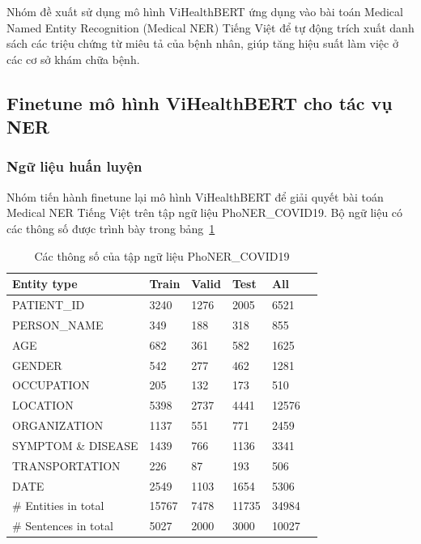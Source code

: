 \documentclass[12pt]{article}
\begin{document}
Nhóm đề xuất sử dụng mô hình ViHealthBERT ứng dụng vào bài toán Medical Named Entity Recognition (Medical NER) Tiếng Việt để tự động trích xuất danh sách các triệu chứng từ miêu tả của bệnh nhân, giúp tăng hiệu suất làm việc ở các cơ sở khám chữa bệnh.

\subsection{Finetune mô hình ViHealthBERT cho tác vụ NER}
\subsubsection{Ngữ liệu huấn luyện}
Nhóm tiến hành finetune lại mô hình ViHealthBERT để giải quyết bài toán Medical NER Tiếng Việt trên tập ngữ liệu PhoNER\_COVID19\cite{truong-etal-2021-covid}. Bộ ngữ liệu có các thông số được trình bày trong bảng~\ref{tab:covid-ner-vietnamese-stats}
\begin{table}
\centering
\begin{tabular}{|l|l|l|l|l|l|}
\hline
\textbf{Entity type} & \textbf{Train} & \textbf{Valid} & \textbf{Test} & \textbf{All} \\
\hline
PATIENT\_ID & 3240 & 1276 & 2005 & 6521 \\
\hdashline
PERSON\_NAME & 349 & 188 & 318 & 855 \\
\hdashline
AGE & 682 & 361 & 582 & 1625 \\
\hdashline
GENDER & 542 & 277 & 462 & 1281 \\
\hdashline
OCCUPATION & 205 & 132 & 173 & 510 \\
\hdashline
LOCATION & 5398 & 2737 & 4441 & 12576 \\
\hdashline
ORGANIZATION & 1137 & 551 & 771 & 2459 \\
\hdashline
SYMPTOM \& DISEASE & 1439 & 766 & 1136 & 3341 \\
\hdashline
TRANSPORTATION & 226 & 87 & 193 & 506 \\
\hdashline
DATE & 2549 & 1103 & 1654 & 5306 \\
\hline
\# Entities in total & 15767 & 7478 & 11735 & 34984 \\
\hline
\# Sentences in total & 5027 & 2000 & 3000 & 10027 \\
\hline
\end{tabular}
\caption{Các thông số của tập ngữ liệu PhoNER\_COVID19\cite{truong-etal-2021-covid}}
\label{tab:covid-ner-vietnamese-stats}
\end{table}
\end{document}

